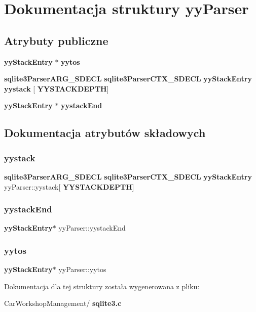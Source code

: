 \section{Dokumentacja struktury yy\+Parser}
\label{structyy_parser}
\subsection*{Atrybuty publiczne}
\begin{DoxyCompactItemize}
\item 
\textbf{ yy\+Stack\+Entry} $\ast$ \textbf{ yytos}
\item 
\textbf{ sqlite3\+Parser\+A\+R\+G\+\_\+\+S\+D\+E\+CL} \textbf{ sqlite3\+Parser\+C\+T\+X\+\_\+\+S\+D\+E\+CL} \textbf{ yy\+Stack\+Entry} \textbf{ yystack} [\textbf{ Y\+Y\+S\+T\+A\+C\+K\+D\+E\+P\+TH}]
\item 
\textbf{ yy\+Stack\+Entry} $\ast$ \textbf{ yystack\+End}
\end{DoxyCompactItemize}


\subsection{Dokumentacja atrybutów składowych}
\mbox{\label{structyy_parser_a02cc855f17b15f966ed629e1d0912114}} 
\subsubsection{yystack}
{\footnotesize\ttfamily \textbf{ sqlite3\+Parser\+A\+R\+G\+\_\+\+S\+D\+E\+CL} \textbf{ sqlite3\+Parser\+C\+T\+X\+\_\+\+S\+D\+E\+CL} \textbf{ yy\+Stack\+Entry} yy\+Parser\+::yystack[\textbf{ Y\+Y\+S\+T\+A\+C\+K\+D\+E\+P\+TH}]}

\mbox{\label{structyy_parser_ab52f79567a18a9197c9d71892af23c43}} 
\subsubsection{yystackEnd}
{\footnotesize\ttfamily \textbf{ yy\+Stack\+Entry}$\ast$ yy\+Parser\+::yystack\+End}

\mbox{\label{structyy_parser_aa00139fa506498c5b8539d502d8052f0}} 
\subsubsection{yytos}
{\footnotesize\ttfamily \textbf{ yy\+Stack\+Entry}$\ast$ yy\+Parser\+::yytos}



Dokumentacja dla tej struktury została wygenerowana z pliku\+:\begin{DoxyCompactItemize}
\item 
Car\+Workshop\+Management/\textbf{ sqlite3.\+c}\end{DoxyCompactItemize}
